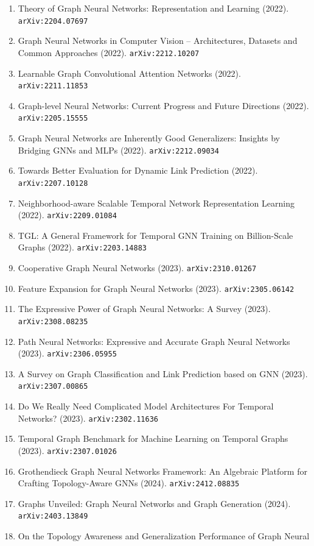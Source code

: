 \documentclass[11pt]{article}
\begin{document}
\begin{enumerate}
  \item Theory of Graph Neural Networks: Representation and Learning (2022). \texttt{arXiv:2204.07697}
  \item Graph Neural Networks in Computer Vision -- Architectures, Datasets and
  Common Approaches (2022). \texttt{arXiv:2212.10207}
  \item Learnable Graph Convolutional Attention Networks (2022). \texttt{arXiv:2211.11853}
  \item Graph-level Neural Networks: Current Progress and Future Directions (2022). \texttt{arXiv:2205.15555}
  \item Graph Neural Networks are Inherently Good Generalizers: Insights by
  Bridging GNNs and MLPs (2022). \texttt{arXiv:2212.09034}
  \item Towards Better Evaluation for Dynamic Link Prediction (2022). \texttt{arXiv:2207.10128}
  \item Neighborhood-aware Scalable Temporal Network Representation Learning (2022). \texttt{arXiv:2209.01084}
  \item TGL: A General Framework for Temporal GNN Training on Billion-Scale
  Graphs (2022). \texttt{arXiv:2203.14883}
  \item Cooperative Graph Neural Networks (2023). \texttt{arXiv:2310.01267}
  \item Feature Expansion for Graph Neural Networks (2023). \texttt{arXiv:2305.06142}
  \item The Expressive Power of Graph Neural Networks: A Survey (2023). \texttt{arXiv:2308.08235}
  \item Path Neural Networks: Expressive and Accurate Graph Neural Networks (2023). \texttt{arXiv:2306.05955}
  \item A Survey on Graph Classification and Link Prediction based on GNN (2023). \texttt{arXiv:2307.00865}
  \item Do We Really Need Complicated Model Architectures For Temporal Networks? (2023). \texttt{arXiv:2302.11636}
  \item Temporal Graph Benchmark for Machine Learning on Temporal Graphs (2023). \texttt{arXiv:2307.01026}
  \item Grothendieck Graph Neural Networks Framework: An Algebraic Platform for Crafting Topology-Aware GNNs (2024). \texttt{arXiv:2412.08835}
  \item Graphs Unveiled: Graph Neural Networks and Graph Generation (2024). \texttt{arXiv:2403.13849}
  \item On the Topology Awareness and Generalization Performance of Graph Neural

\end{enumerate}
\end{document}
